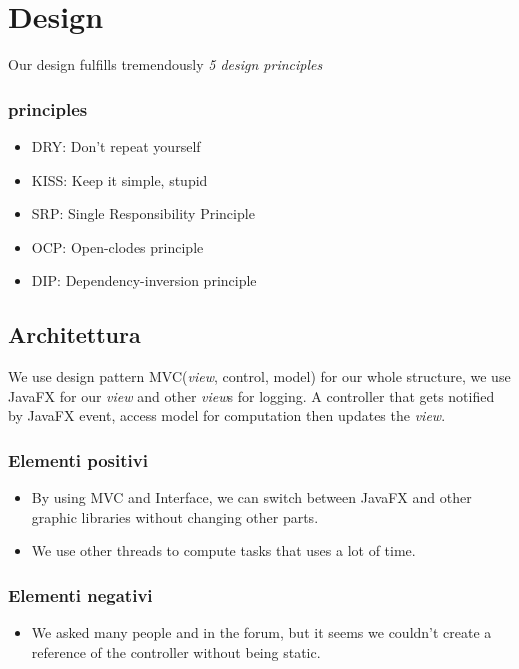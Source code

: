 \documentclass[a4paper,12pt]{report}
\begin{document}
\chapter{Design}
Our design fulfills tremendously \textit{5 design principles}
\subsection*{principles}
\begin{itemize}
    \item DRY: Don’t repeat yourself 
    \item KISS: Keep it simple, stupid 
    \item SRP: Single Responsibility Principle
    \item OCP: Open-clodes principle
    \item DIP: Dependency-inversion principle
\end{itemize}

\section{Architettura}
    We use design pattern MVC(\textit{view}, control, model) for our whole structure, we use JavaFX for our \textit{view} and other \textit{view}s for logging.  
    A controller that gets notified by JavaFX event, access model for computation then updates the \textit{view}.  

\subsection*{Elementi positivi}
\begin{itemize}
    \item By using MVC and Interface, we can switch between JavaFX and other graphic libraries without changing other parts. 
    \item We use other threads to compute tasks that uses a lot of time.
\end{itemize}

\subsection*{Elementi negativi}
\begin{itemize}
    \item We asked many people and in the forum, but it seems we couldn't create a reference of the controller without being static.
\end{itemize}
\end{document}
